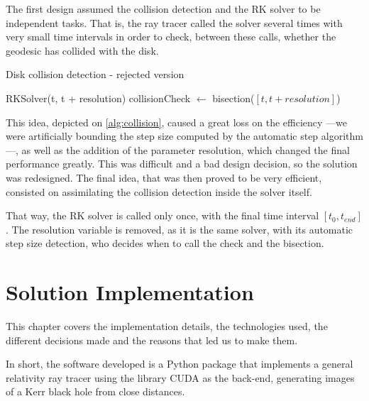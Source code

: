 The first design assumed the collision detection and the \ac{RK} solver to be independent tasks. That is, the ray tracer called the solver several times with very small time intervals in order to check, between these calls, whether the geodesic has collided with the disk.

\begin{algorithm}
	\caption{Disk collision detection - rejected version}
	\label{alg:collision}
	\begin{algorithmic}[1]
		\State RKSolver(t, t + resolution)
		\State collisionCheck $\gets$ bisection($[t, t + resolution]$)
		\EndIf
		\EndFor
		\EndFunction
	\end{algorithmic}
\end{algorithm}

This idea, depicted on \ref{alg:collision}, caused a great loss on the efficiency ---we were artificially bounding the step size computed by the automatic step algorithm---, as well as the addition of the parameter resolution, which changed the final performance greatly. This was difficult and a bad design decision, so the solution was redesigned. The final idea, that was then proved to be very efficient, consisted on assimilating the collision detection inside the solver itself.

That way, the \ac{RK} solver is called only once, with the final time interval $[t_0, t_{end}]$. The resolution variable is removed, as it is the same solver, with its automatic step size detection, who decides when to call the check and the bisection.

















\section{Solution Implementation}
\label{chapter:implementation}

This chapter covers the implementation details, the technologies used, the different decisions made and the reasons that led us to make them.

In short, the software developed is a Python package that implements a general relativity ray tracer using the library \ac{CUDA} as the back-end, generating images of a Kerr black hole from close distances.

